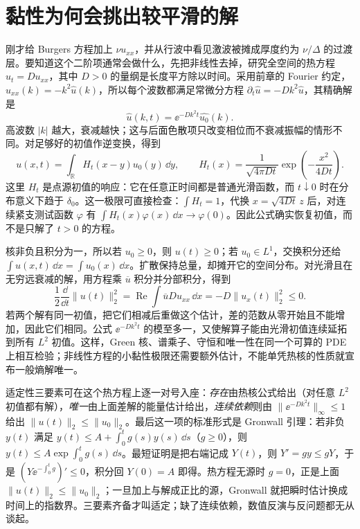 

\section{黏性为何会挑出较平滑的解}

刚才给 Burgers 方程加上 \(\nu u_{xx}\)，并从行波中看见激波被摊成厚度约为 \(\nu/\Delta\) 的过渡层。要知道这个二阶项通常会做什么，先把非线性去掉，研究全空间的热方程 \(u_t=D u_{xx}\)，其中 \(D>0\) 的量纲是长度平方除以时间。采用前章的 Fourier 约定，\(\widehat{u_{xx}}(k)=-k^2\widehat u(k)\)，所以每个波数都满足常微分方程 \(\partial_t\widehat u=-Dk^2\widehat u\)，其精确解是
\[
 \widehat u(k,t)=\ee^{-Dk^2t}\widehat{u_0}(k).
\]
高波数 \(|k|\) 越大，衰减越快；这与后面色散项只改变相位而不衰减振幅的情形不同。对足够好的初值作逆变换，得到
\begin{equation}
 u(x,t)=\int_{\mathbb R}H_t(x-y)u_0(y)\,\dd y,
 \qquad H_t(x)=\frac{1}{\sqrt{4\pi Dt}}\exp\!\left(-\frac{x^2}{4Dt}\right).
 \label{eq:math-heat-kernel}
\end{equation}
这里 \(H_t\) 是点源初值的响应：它在任意正时间都是普通光滑函数，而 \(t\downarrow0\) 时在分布意义下趋于 \(\delta_0\)。这一极限可直接检查：\(\int H_t=1\)，代换 \(x=\sqrt{4Dt}\,z\) 后，对连续紧支测试函数 \(\varphi\) 有 \(\int H_t(x)\varphi(x)\,\dd x\to\varphi(0)\)。因此公式确实恢复初值，而不是只解了 \(t>0\) 的方程。

核非负且积分为一，所以若 \(u_0\ge0\)，则 \(u(t)\ge0\)；若 \(u_0\in L^1\)，交换积分还给 \(\int u(x,t)\,\dd x=\int u_0(x)\,\dd x\)。扩散保持总量，却摊开它的空间分布。对光滑且在无穷远衰减的解，用方程乘 \(\overline u\) 积分并分部积分，得到
\[
 \frac12\frac{\dd}{\dd t}\|u(t)\|_2^2
 =\operatorname{Re}\int\overline u D u_{xx}\,\dd x
 =-D\|u_x(t)\|_2^2\le0.
\]
若两个解有同一初值，把它们相减后重做这个估计，差的范数从零开始且不能增加，因此它们相同。公式 \(\ee^{-Dk^2t}\) 的模至多一，又使解算子能由光滑初值连续延拓到所有 \(L^2\) 初值。这样，Green 核、谱乘子、守恒和唯一性在同一个可算的 PDE 上相互检验；非线性方程的小黏性极限还需要额外估计，不能单凭热核的性质就宣布一般熵解唯一。

适定性三要素可在这个热方程上逐一对号入座：\emph{存在}由热核公式给出（对任意 \(L^2\) 初值都有解），\emph{唯一}由上面差解的能量估计给出，\emph{连续依赖}则由 \(\|\ee^{-Dk^2t}\|_\infty\le1\) 给出 \(\|u(t)\|_2\le\|u_0\|_2\)。最后这一项的标准形式是 Gronwall 引理：若非负 \(y(t)\) 满足 \(y(t)\le A+\int_0^t g(s)y(s)\,\dd s\)（\(g\ge0\)），则 \(y(t)\le A\exp\!\int_0^t g(s)\,\dd s\)。最短证明是把右端记成 \(Y(t)\)，则 \(Y'=gy\le gY\)，于是 \((Y\ee^{-\int_0^t g})'\le0\)，积分回 \(Y(0)=A\) 即得。热方程无源时 \(g=0\)，正是上面 \(\|u(t)\|_2\le\|u_0\|_2\)；一旦加上与解成正比的源，Gronwall 就把瞬时估计换成时间上的指数界。三要素齐备才叫适定；缺了连续依赖，数值反演与反问题都无从谈起。


